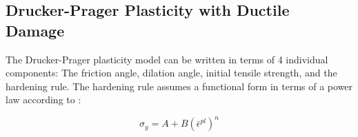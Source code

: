 \subsection{Drucker-Prager Plasticity with Ductile Damage}

The Drucker-Prager plasticity model can be written in terms of 4 individual
components: The friction angle, dilation angle, initial tensile strength,
and the hardening rule. The hardening rule assumes a functional form
in terms of a power law according to \cite{prantl_identification_2013}:


\begin{equation}
\sigma_{y}=A+B\left(\bar{\epsilon}^{pl}\right)^{n}
\end{equation}
